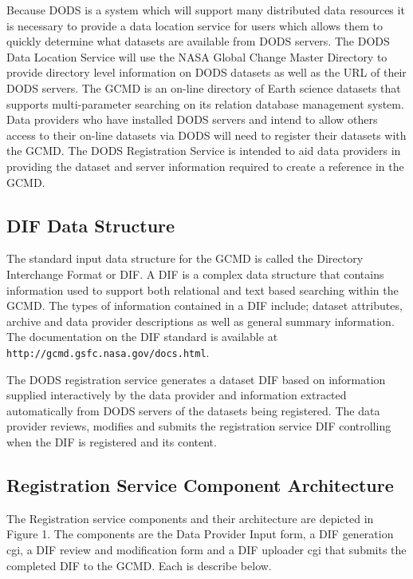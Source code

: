 Because DODS is a system which will support many distributed data resources
it is necessary to provide a data location service for users which allows
them to quickly determine what datasets are available from DODS servers.  The
DODS Data Location Service will use the NASA Global Change Master Directory
to provide directory level information on DODS datasets as well as the URL of
their DODS servers.  The GCMD is an on-line directory of Earth science
datasets that supports multi-parameter searching on its relation database
management system.  Data providers who have installed DODS servers and intend
to allow others access to their on-line datasets via DODS will need to
register their datasets with the GCMD.  The DODS Registration Service is
intended to aid data providers in providing the dataset and server
information required to create a reference in the GCMD.

\subsection{DIF Data Structure}

The standard input data structure for the GCMD is called the Directory
Interchange Format or DIF.  A DIF is a complex data structure that contains
information used to support both relational and text based searching within
the GCMD.  The types of information contained in a DIF include; dataset
attributes, archive and data provider descriptions as well as general summary
information.  The documentation on the DIF standard is available at {\tt
  http://gcmd.gsfc.nasa.gov/docs.html}.

The DODS registration service generates a dataset DIF based on information
supplied interactively by the data provider and information extracted
automatically from DODS servers of the datasets being registered.  The data
provider reviews, modifies and submits the registration service DIF
controlling when the DIF is registered and its content.  


\subsection{Registration Service Component Architecture}

The Registration service components and their architecture are depicted in
Figure 1.  The components are the Data Provider Input form, a DIF generation
cgi, a DIF review and modification form and a DIF uploader cgi that submits
the completed DIF to the GCMD.  Each is describe below.


